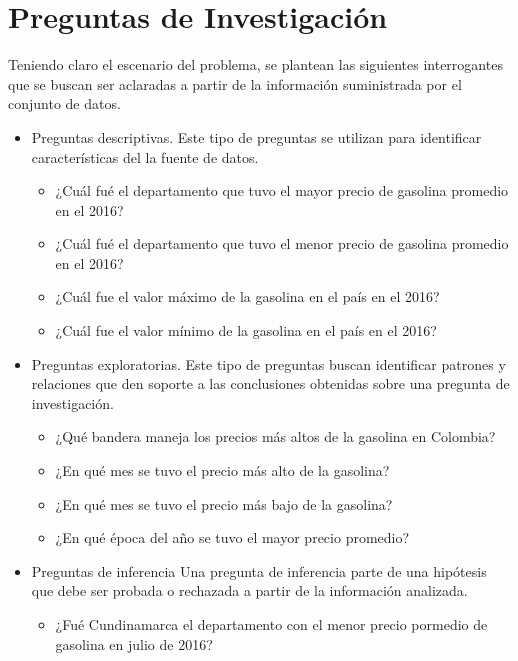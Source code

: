 \section{Preguntas de Investigación}
Teniendo claro el escenario del problema, se plantean las siguientes interrogantes que se buscan ser aclaradas a partir de la información suministrada por el conjunto de datos.
 \begin{itemize}
  \item{Preguntas descriptivas.}
  Este tipo de preguntas se utilizan para identificar características del la fuente de datos.
  \begin{itemize}
   \item ¿Cuál fué el departamento que tuvo el mayor precio de gasolina promedio en el 2016?
   \item ¿Cuál fué el departamento que tuvo el menor precio de gasolina promedio en el 2016?
   \item ¿Cuál fue el valor máximo de la gasolina en el país en el 2016?
   \item ¿Cuál fue el valor mínimo de la gasolina en el país en el 2016?
  \end{itemize}
  \item{Preguntas exploratorias.}
   Este tipo de preguntas buscan identificar patrones y relaciones que den soporte a las conclusiones obtenidas sobre una pregunta de investigación.
  \begin{itemize}
   \item ¿Qué bandera maneja los precios más altos de la gasolina en Colombia? 
   \item ¿En qué mes se tuvo el precio más alto de la gasolina?
   \item ¿En qué mes se tuvo el precio más bajo de la gasolina?  
   \item ¿En qué época del año se tuvo el mayor precio promedio?
  \end{itemize}
  \item{Preguntas de inferencia}
   Una pregunta de inferencia parte de una hipótesis que debe ser probada o rechazada a partir de la información analizada.
  \begin{itemize}
   \item ¿Fué Cundinamarca el departamento con el menor precio pormedio de gasolina en julio de 2016?
  \end{itemize}
 \end{itemize}